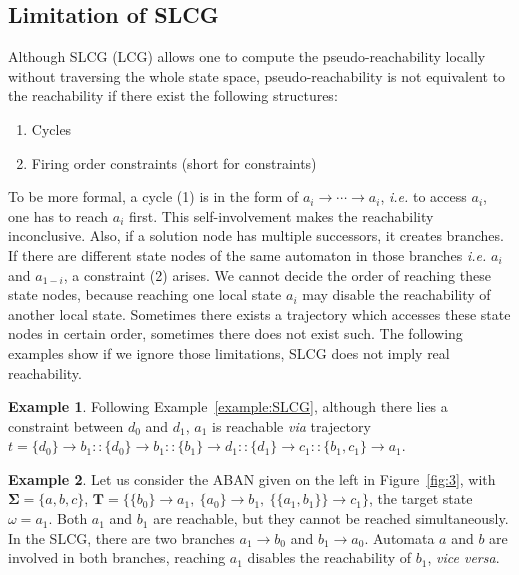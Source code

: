 \documentclass{article}
\newcommand{\acm}[3]{\{#1\}\rightarrow#3}
\theoremstyle{definition}
\newtheorem{example}{Example}
\begin{document}
\subsection{Limitation of SLCG}\label{limitation}
Although SLCG (LCG) allows one to compute the pseudo-reachability locally without traversing the whole state space, pseudo-reachability is not equivalent to the reachability if there exist the following structures:
\begin{enumerate}[label={(\arabic*)}]
\item Cycles
\item Firing order constraints (short for constraints)
\end{enumerate}
To be more formal, a cycle (1) is in the form of $a_i\to\cdots\to a_i$, \textit{i.e.} to access $a_i$, one has to reach $a_i$ first. This self-involvement makes the reachability inconclusive. 
Also, if a solution node has multiple successors, it creates branches.
If there are different state nodes of the same automaton in those branches \textit{i.e.} $a_i$ and $a_{1-i}$, a constraint (2) arises. 
We cannot decide the order of reaching these state nodes, because reaching one local state $a_i$ may disable the reachability of another local state.
Sometimes there exists a trajectory which accesses these state nodes in certain order, sometimes there does not exist such.
The following examples show if we ignore those limitations, SLCG does not imply real reachability.


\begin{example}\label{example:reach}
Following Example~\ref{example:SLCG}, although there lies a constraint between $d_0$ and $d_1$, $a_1$ is reachable \textit{via} trajectory $t=\acm{d_0}{b_0}{b_1}::\acm{d_0}{b_0}{b_1}::\acm{b_1}{d_0}{d_1}::\acm{d_1}{c_0}{c_1}::\acm{b_1,c_1}{a_0}{a_1}$.
\end{example}

\begin{example}\label{example:unreach}
Let us consider the ABAN given on the left in Figure~\ref{fig:3}, with $\mathbf{\Sigma}=\{a,b,c\}$, $\mathbf{T}=\{\acm{b_0}{a_0}{a_1},\ \acm{a_0}{b_0}{b_1},\ \acm{\{a_1,b_1\}}{c_0}{c_1}\}$, the target state $\omega=a_1$. 
Both $a_1$ and $b_1$ are reachable, but they cannot be reached simultaneously.
In the SLCG, there are two branches $a_1\to b_0$ and $b_1\to a_0$.
Automata $a$ and $b$ are involved in both branches, reaching $a_1$ disables the reachability of $b_1$, \textit{vice versa}.
\end{example}
\end{document}
